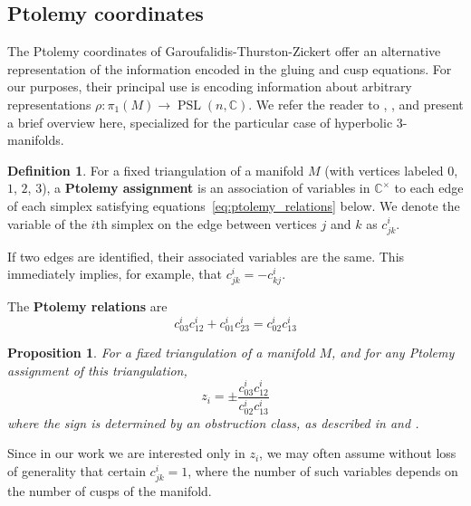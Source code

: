 \documentclass[10pt]{amsart}
\newtheorem{proposition}[theorem]{Proposition}
\numberwithin{equation}{theorem}
\theoremstyle{definition}
\newtheorem{definition}[theorem]{Definition}
\newcommand{\definedterm}[1]{\textbf{#1}}
\newcommand{\PSL}{\operatorname{PSL}}
\begin{document}
\subsection{Ptolemy coordinates}

The Ptolemy coordinates of Garoufalidis-Thurston-Zickert offer an
alternative representation of the information encoded in the gluing
and cusp equations.  For our purposes, their principal use is encoding
information about arbitrary representations
$\rho : \pi_1(M) \to \PSL(n, \mathbb{C})$.  We refer the reader
to \parencite{garoufalidis2015}, \parencite{1401.5542}, and present a
brief overview here, specialized for the particular case of hyperbolic
$3$-manifolds.

\begin{definition}
  For a fixed triangulation of a manifold $M$ (with vertices labeled
  $0$, $1$, $2$, $3$), a \definedterm{Ptolemy assignment} is an
  association of variables in $\mathbb{C}^{\times}$ to each edge of
  each simplex satisfying equations~\ref{eq:ptolemy_relations}
  below. We denote the variable of the $i$th simplex on the edge
  between vertices $j$ and $k$ as $c^i_{jk}$.

  If two edges are identified, their associated variables are the
  same.  This immediately implies, for example, that
  $c^i_{jk} = -c^i_{kj}$.

  The \definedterm{Ptolemy relations} are
  \begin{equation}
    \label{eq:ptolemy_relations}
    c_{03}^{i}c_{12}^{i} + c^i_{01}c^i_{23} = c^i_{02}c^i_{13}
  \end{equation}
\end{definition}

\begin{proposition}
  For a fixed triangulation of a manifold $M$, and for any Ptolemy
  assignment of this triangulation,
  \begin{equation}
    \label{eq:ptolemy_to_cross_ratio}
    z_i = \pm \frac{c^i_{03} c^i_{12}}{c^i_{02} c^i_{13}}
  \end{equation}
  where the sign is determined by an obstruction class, as described
  in \parencite{1401.5542} and \parencite{garoufalidis2015}.
\end{proposition}

Since in our work we are interested only in $z_i$, we may often assume
without loss of generality that certain $c^i_{jk} = 1$, where the number
of such variables depends on the number of cusps of the manifold.
\end{document}

